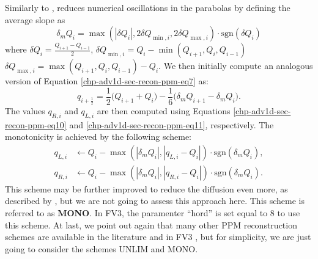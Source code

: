 Similarly to \citet{colella:1984}, \citet{lin:2004} reduces numerical oscillations
in the parabolas by defining the average slope as
\begin{equation}
	\label{chp-adv1d-sec-mono-eq4}
	\delta_m Q_{i} = 
	\max(|\delta Q_i|, 2\delta Q_{\min,i}, 2\delta Q_{\max,i}) \cdot \text{sgn}(\delta Q_i)
\end{equation}
where 
$\delta Q_i= \frac{Q_{i+1}-Q_{i-1}}{2}$,
$\delta Q_{\min,i} = Q_i - \min(Q_{i+1}, Q_i, Q_{i-1})$ 
$\delta Q_{\max,i} = \max(Q_{i+1}, Q_i, Q_{i-1}) - Q_i$.
We then initially compute an analogous version of Equation \eqref{chp-adv1d-sec-recon-ppm-eq7} as:
\begin{equation}
	q_{i+\frac{1}{2}} = 
	\frac{1}{2} \bigg( Q_{i+1} + Q_{i} \bigg) - \frac{1}{6} \bigg( \delta_m Q_{i+1} - \delta_m Q_{i}\bigg).
\end{equation}
The values $q_{R,i}$ and $q_{L,i}$ are then computed using Equations \eqref{chp-adv1d-sec-recon-ppm-eq10}
and \eqref{chp-adv1d-sec-recon-ppm-eq11}, respectively.
The monotonicity is achieved by the following scheme:
\begin{align}
	\label{chp-adv1d-sec-mono-eq5}
	q_{L,i} &\leftarrow Q_i - \max(|\delta_m Q_i|, |q_{L,i}-Q_i|) \cdot \text{sgn}(\delta_m Q_i),\\
	q_{R,i} &\leftarrow Q_i - \max(|\delta_m Q_i|, |q_{R,i}-Q_i|) \cdot \text{sgn}(\delta_m Q_i).
\end{align}
This scheme may be further improved to reduce the diffusion even more, as described by \citet{lin:2004},
but we are not going to assess this approach here.
This scheme is referred to as \textbf{MONO}.
In FV3, the paramenter ``hord'' is set equal to 8 to use this scheme.
At last, we point out again that many other PPM reconstruction schemes are available in the literature and in FV3 
\citep{harris:2021,lin:2017}, but for simplicity, we are just going to consider the schemes UNLIM and MONO.


